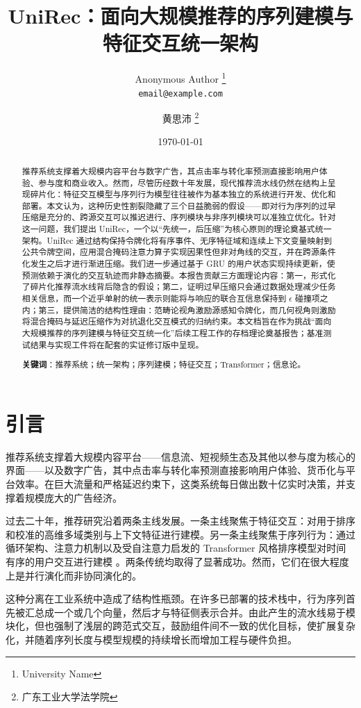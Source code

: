 \documentclass{article}
\title{UniRec：面向大规模推荐的序列建模与特征交互统一架构}
\author{Anonymous Author \thanks{University Name} \\ \texttt{email@example.com}
	\and
		黄思沛 \thanks{广东工业大学法学院}}
\date{\today}
\begin{document}
\maketitle


\begin{abstract}
推荐系统支撑着大规模内容平台与数字广告，其点击率与转化率预测直接影响用户体验、参与度和商业收入。然而，尽管历经数十年发展，现代推荐流水线仍然在结构上呈现碎片化：特征交互模型与序列行为模型往往被作为基本独立的系统进行开发、优化和部署。本文认为，这种历史性割裂隐藏了三个日益脆弱的假设——即对行为序列的过早压缩是充分的、跨源交互可以推迟进行、序列模块与非序列模块可以准独立优化。针对这一问题，我们提出 UniRec，一个以“先统一，后压缩”为核心原则的理论奠基式统一架构。UniRec 通过结构保持令牌化将有序事件、无序特征域和连续上下文变量映射到公共令牌空间，应用混合掩码注意力算子实现因果性但非对角线的交互，并在跨源条件化发生之后才进行渐进压缩。我们进一步通过基于 GRU 的用户状态实现持续更新，使预测依赖于演化的交互轨迹而非静态摘要。本报告贡献三方面理论内容：第一，形式化了碎片化推荐流水线背后隐含的假设；第二，证明过早压缩只会通过数据处理减少任务相关信息，而一个近乎单射的统一表示则能将与响应的联合互信息保持到 \(\epsilon\) 碰撞项之内；第三，提供简洁的结构性理由：范畴论视角激励源感知令牌化，而几何视角则激励将混合掩码与延迟压缩作为对抗退化交互模式的归纳约束。本文档旨在作为挑战“面向大规模推荐的序列建模与特征交互统一化”后续工程工作的存档理论奠基报告；基准测试结果与实现工件将在配套的实证修订版中呈现。

\textbf{关键词}：推荐系统；统一架构；序列建模；特征交互；Transformer；信息论。
\end{abstract}

\section{引言}

推荐系统支撑着大规模内容平台——信息流、短视频生态及其他以参与度为核心的界面——以及数字广告，其中点击率与转化率预测直接影响用户体验、货币化与平台效率。在巨大流量和严格延迟约束下，这类系统每日做出数十亿实时决策，并支撑着规模庞大的广告经济。

过去二十年，推荐研究沿着两条主线发展。一条主线聚焦于特征交互：对用于排序和校准的高维多域类别与上下文特征进行建模。另一条主线聚焦于序列行为：通过循环架构、注意力机制以及受自注意力启发的 Transformer 风格排序模型对时间有序的用户交互进行建模 \cite{vaswani2017attention}。两条传统均取得了显著成功。然而，它们在很大程度上是并行演化而非协同演化的。

这种分离在工业系统中造成了结构性瓶颈。在许多已部署的技术栈中，行为序列首先被汇总成一个或几个向量，然后才与特征侧表示合并。由此产生的流水线易于模块化，但也强制了浅层的跨范式交互，鼓励组件间不一致的优化目标，使扩展复杂化，并随着序列长度与模型规模的持续增长而增加工程与硬件负担。
\end{document}
